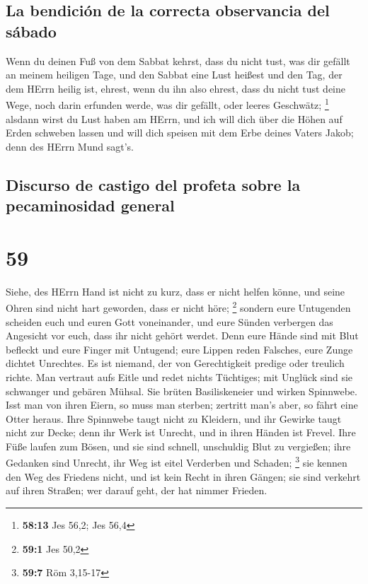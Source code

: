 \hypertarget{la-bendiciuxf3n-de-la-correcta-observancia-del-suxe1bado}{%
\subsection{La bendición de la correcta observancia del
sábado}\label{la-bendiciuxf3n-de-la-correcta-observancia-del-suxe1bado}}

 Wenn du deinen Fuß von dem Sabbat kehrst, dass du nicht
tust, was dir gefällt an meinem heiligen Tage, und den Sabbat eine Lust
heißest und den Tag, der dem HErrn heilig ist, ehrest, wenn du ihn also
ehrest, dass du nicht tust deine Wege, noch darin erfunden werde, was
dir gefällt, oder leeres Geschwätz; \footnote{\textbf{58:13} Jes 56,2;
  Jes 56,4}  alsdann wirst du Lust haben am HErrn, und
ich will dich über die Höhen auf Erden schweben lassen und will dich
speisen mit dem Erbe deines Vaters Jakob; denn des HErrn Mund sagt's.

\hypertarget{discurso-de-castigo-del-profeta-sobre-la-pecaminosidad-general}{%
\subsection{Discurso de castigo del profeta sobre la pecaminosidad
general}\label{discurso-de-castigo-del-profeta-sobre-la-pecaminosidad-general}}

\hypertarget{section-58}{%
\section{59}\label{section-58}}

 Siehe, des HErrn Hand ist nicht zu kurz, dass er nicht
helfen könne, und seine Ohren sind nicht hart geworden, dass er nicht
höre; \footnote{\textbf{59:1} Jes 50,2}  sondern eure
Untugenden scheiden euch und euren Gott voneinander, und eure Sünden
verbergen das Angesicht vor euch, dass ihr nicht gehört werdet.
 Denn eure Hände sind mit Blut befleckt und eure Finger
mit Untugend; eure Lippen reden Falsches, eure Zunge dichtet Unrechtes.
 Es ist niemand, der von Gerechtigkeit predige oder
treulich richte. Man vertraut aufs Eitle und redet nichts Tüchtiges; mit
Unglück sind sie schwanger und gebären Mühsal.  Sie brüten
Basiliskeneier und wirken Spinnwebe. Isst man von ihren Eiern, so muss
man sterben; zertritt man's aber, so fährt eine Otter heraus.
 Ihre Spinnwebe taugt nicht zu Kleidern, und ihr Gewirke
taugt nicht zur Decke; denn ihr Werk ist Unrecht, und in ihren Händen
ist Frevel.  Ihre Füße laufen zum Bösen, und sie sind
schnell, unschuldig Blut zu vergießen; ihre Gedanken sind Unrecht, ihr
Weg ist eitel Verderben und Schaden; \footnote{\textbf{59:7} Röm 3,15-17}
 sie kennen den Weg des Friedens nicht, und ist kein Recht
in ihren Gängen; sie sind verkehrt auf ihren Straßen; wer darauf geht,
der hat nimmer Frieden.

